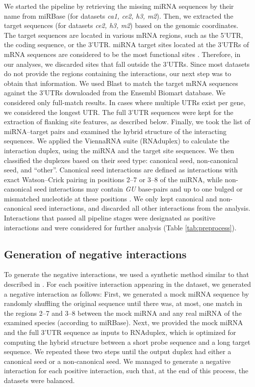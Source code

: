 \documentclass{bmcart}
\begin{document}
We started the pipeline by retrieving the missing miRNA sequences by their name from miRBase (for datasets  \textit{ca1, ce2, h3, m2}). Then, we extracted the target sequences (for datasets \textit{ce2, h3, m2}) based on the genomic coordinates. The target sequences are located in various mRNA regions, such as the 5'UTR, the coding sequence, or the 3'UTR. miRNA target sites located at the 3'UTRs of mRNA sequences are considered to be the most functional sites \cite{menor2014mirmark, baek2008impact}. Therefore, in our analyses, we discarded sites that fall outside the 3'UTRs. Since most datasets do not provide the regions containing the interactions, our next step was to obtain that information. We used Blast \cite{altschul1990basic_blast} to match the target mRNA sequences against the 3'UTRs downloaded from the Ensembl Biomart database. We considered only full-match results. In cases where multiple UTRs exist per gene, we considered the longest UTR. The full 3'UTR sequences were kept for the extraction of flanking site features, as described below. Finally, we took the list of miRNA--target pairs and examined the hybrid structure of the interacting sequences. We applied the ViennaRNA suite (RNAduplex) \cite{lorenz2011viennarna} to calculate the interaction duplex, using the miRNA and the target site sequences. We then classified the duplexes based on their seed type: canonical seed, non-canonical seed, and ``other''. Canonical seed interactions are defined as interactions with exact Watson--Crick pairing in positions 2–7 or 3–8 of the miRNA, while non-canonical seed interactions may contain \textit{GU} base-pairs and up to one bulged or mismatched nucleotide at these positions \cite{helwak2013mapping}. We only kept canonical and non-canonical seed interactions, and discarded all other interactions from the analysis.
Interactions that passed all pipeline stages were designated as positive interactions and were considered for further analysis (Table \ref{tab:preprocess}).



\subsection*{Generation of negative interactions} \label{method_negative}
To generate the negative interactions, we used a synthetic method similar to that described in \cite{menor2014mirmark, john2004human, maragkakis2009accurate}. For each positive interaction appearing in the dataset, we generated a negative interaction as follows: First, we generated a mock miRNA sequence by randomly shuffling the original sequence until there was, at most, one match in the regions 2--7 and 3--8 between the mock miRNA and any real miRNA of the examined species (according to miRBase). Next, we provided the mock miRNA and the full 3'UTR sequence as inputs to RNAduplex, which is optimized for computing the hybrid structure between a short probe sequence and a long target sequence. We repeated these two steps until the output duplex had either a canonical seed or a non-canonical seed. 
We managed to generate a negative interaction for each positive interaction, such that, at the end of this process, the datasets were balanced.
\end{document}

